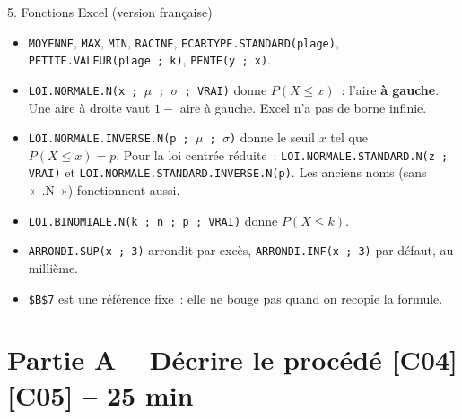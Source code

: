\documentclass[a4paper,11pt]{article}
\newcommand{\duree}[1]{\hfill{\normalsize\color{uimmred}#1}}
\begin{document}
\begin{rappel}{5. Fonctions Excel (version française)}
\footnotesize
\begin{itemize}[leftmargin=10pt, itemsep=0pt, topsep=1pt]
  \item \texttt{MOYENNE}, \texttt{MAX}, \texttt{MIN}, \texttt{RACINE}, \texttt{ECARTYPE.\allowbreak STANDARD(plage)}, \texttt{PETITE.VALEUR(plage\,;\,k)}, \texttt{PENTE(y\,;\,x)}.
  \item \texttt{LOI.NORMALE.N(x\,;\,$\mu$\,;\,$\sigma$\,;\,VRAI)} donne $P(X \leq x)$~: l'aire \textbf{à gauche}. Une aire à droite vaut $1 - $ aire à gauche. Excel n'a pas de borne infinie.
  \item \texttt{LOI.NORMALE.\allowbreak INVERSE.N(p\,;\,$\mu$\,;\,$\sigma$)} donne le seuil $x$ tel que $P(X \leq x) = p$. Pour la loi centrée réduite~: \texttt{LOI.NORMALE.\allowbreak STANDARD.N(z\,;\,VRAI)} et \texttt{LOI.NORMALE.\allowbreak STANDARD.\allowbreak INVERSE.N(p)}. Les anciens noms (sans «~.N~») fonctionnent aussi.
  \item \texttt{LOI.BINOMIALE.N(k\,;\,n\,;\,p\,;\,VRAI)} donne $P(X \leq k)$.
  \item \texttt{ARRONDI.SUP(x\,;\,3)} arrondit par excès, \texttt{ARRONDI.INF(x\,;\,3)} par défaut, au millième.
  \item \texttt{\$B\$7} est une référence fixe~: elle ne bouge pas quand on recopie la formule.
\end{itemize}
\end{rappel}

\needspace{9cm}
\section{Partie A -- Décrire le procédé \duree{[C04] [C05] -- 25 min}}
\end{document}
